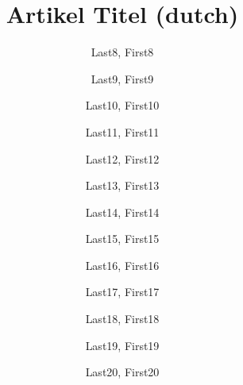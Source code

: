 \documentclass[dutch]{nwejmart}
\begin{document}
\title{Artikel Titel (dutch)}
\author[affiliation={Affiliation 8}]{Last8, First8}
\author[affiliation={Affiliation 9}]{Last9, First9}
\author[affiliation={Affiliation 10}]{Last10, First10}
\author[affiliation={Affiliation 11}]{Last11, First11}
\author[affiliation={Affiliation 12}]{Last12, First12}
\author[affiliation={Affiliation 13}]{Last13, First13}
\author[affiliation={Affiliation 14}]{Last14, First14}
\author[affiliation={Affiliation 15}]{Last15, First15}
\author[affiliation={Affiliation 16}]{Last16, First16}
\author[affiliation={Affiliation 17}]{Last17, First17}
\author[affiliation={Affiliation 18}]{Last18, First18}
\author[affiliation={Affiliation 19}]{Last19, First19}
\author[affiliation={Affiliation 20}]{Last20, First20}
%
\end{document}
